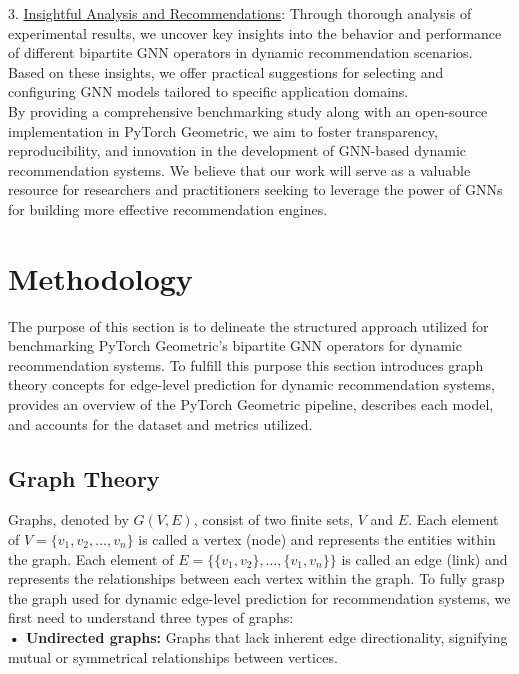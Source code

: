 \documentclass[bst/sn-nature]{sn-jnl}
\begin{document}
\begin{multicols}{2}
3. \underline{Insightful Analysis and Recommendations}: Through thorough analysis of experimental results, we uncover key insights into the behavior and performance of different bipartite GNN operators in dynamic recommendation scenarios. Based on these insights, we offer practical suggestions for selecting and configuring GNN models tailored to specific application domains. \\ 

By providing a comprehensive benchmarking study along with an open-source implementation in PyTorch Geometric, we aim to foster transparency, reproducibility, and innovation in the development of GNN-based dynamic recommendation systems. We believe that our work will serve as a valuable resource for researchers and practitioners seeking to leverage the power of GNNs for building more effective recommendation engines.

\section{Methodology}

\quad The purpose of this section is to delineate the structured approach utilized for benchmarking PyTorch Geometric's bipartite GNN operators for dynamic recommendation systems. To fulfill this purpose this section introduces graph theory concepts for edge-level prediction for dynamic recommendation systems, provides an overview of the PyTorch Geometric pipeline, describes each model, and accounts for the dataset and metrics utilized.

\subsection{Graph Theory}

\quad Graphs, denoted by $G(V, E)$, consist of two finite sets, $V$ and $E$. Each element of $V = \{v_{1}, v_{2}, \ldots, v_{n}\}$ is called a vertex (node) and represents the entities within the graph. Each element of $E = \{ \{v_{1}, v_{2}\}, \ldots, \{v_{1}, v_{n}\}\}$ is called an edge (link) and represents the relationships between each vertex within the graph. To fully grasp the graph used for dynamic edge-level prediction for recommendation systems, we first need to understand three types of graphs: \\ 

\textbf{• Undirected graphs:} Graphs that lack inherent edge directionality, signifying mutual or symmetrical relationships between vertices. \\ 


\end{multicols}
\end{document}
